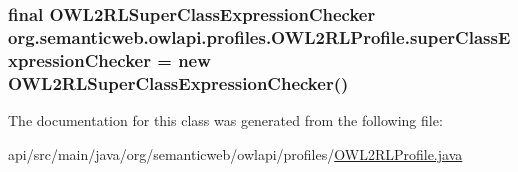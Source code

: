 \hypertarget{classorg_1_1semanticweb_1_1owlapi_1_1profiles_1_1_o_w_l2_r_l_profile_a181793c61923549b4a43f3d1c05ca183}{
\subsubsection[{super\-Class\-Expression\-Checker}]{\setlength{\rightskip}{0pt plus 5cm}final {\bf O\-W\-L2\-R\-L\-Super\-Class\-Expression\-Checker} org.\-semanticweb.\-owlapi.\-profiles.\-O\-W\-L2\-R\-L\-Profile.\-super\-Class\-Expression\-Checker = new {\bf O\-W\-L2\-R\-L\-Super\-Class\-Expression\-Checker}()\hspace{0.3cm}{\ttfamily [private]}}}\label{classorg_1_1semanticweb_1_1owlapi_1_1profiles_1_1_o_w_l2_r_l_profile_a181793c61923549b4a43f3d1c05ca183}


The documentation for this class was generated from the following file\-:\begin{DoxyCompactItemize}
\item 
api/src/main/java/org/semanticweb/owlapi/profiles/\hyperlink{_o_w_l2_r_l_profile_8java}{O\-W\-L2\-R\-L\-Profile.\-java}\end{DoxyCompactItemize}
